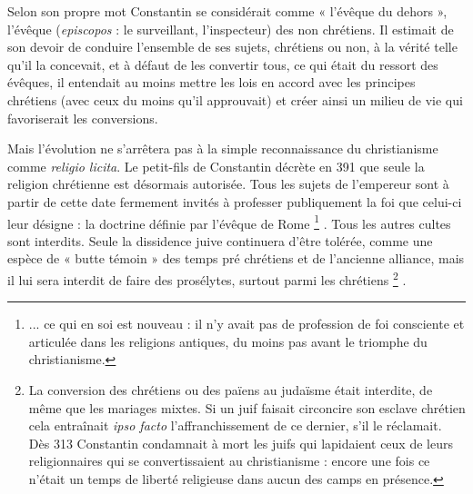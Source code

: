  Selon son propre mot Constantin se considérait comme « l'évêque du dehors », l'évêque (\emph{episcopos} : le surveillant, l'inspecteur) des non chrétiens. Il estimait de son devoir de conduire l'ensemble de ses sujets, chrétiens ou non, à la vérité telle qu'il la concevait, et à défaut de les convertir tous, ce qui était du ressort des évêques, il entendait au moins mettre les lois en accord avec les principes chrétiens (avec ceux du moins qu'il approuvait) et créer ainsi un milieu de vie qui favoriserait les conversions.

 Mais l'évolution ne s'arrêtera pas à la simple reconnaissance du christianisme comme \emph{religio licita}. Le petit-fils de Constantin décrète en 391 que seule la religion chrétienne est désormais autorisée. Tous les sujets de l'empereur sont à partir de cette date fermement invités à professer publiquement la foi que celui-ci leur désigne : la doctrine définie par l'évêque de Rome%
\footnote{... ce qui en soi est nouveau : il n'y avait pas de profession de foi consciente et articulée dans les religions antiques, du moins pas avant le triomphe du christianisme.}%
. Tous les autres cultes sont interdits. Seule la dissidence juive continuera d'être tolérée, comme une espèce de « butte témoin » des temps pré chrétiens et de l'ancienne alliance, mais il lui sera interdit de faire des prosélytes, surtout parmi les chrétiens%
\footnote{La conversion des chrétiens ou des païens au judaïsme était interdite, de même que les mariages mixtes. Si un juif faisait circoncire son esclave chrétien cela entraînait \emph{ipso facto} l'affranchissement de ce dernier, s'il le réclamait. Dès 313 Constantin condamnait à mort les juifs qui lapidaient ceux de leurs religionnaires qui se convertissaient au christianisme : encore une fois ce n'était un temps de liberté religieuse dans aucun des camps en présence.}%
. 

